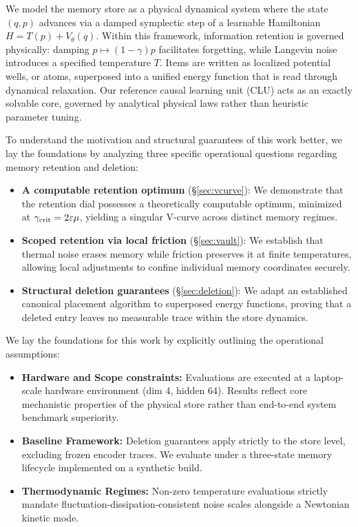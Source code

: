 \documentclass{article}
\begin{document}
We model the memory store as a physical dynamical system where the state $(q,p)$ advances via a damped symplectic step of a learnable Hamiltonian $H=T(p)+V_\theta(q)$. Within this framework, information retention is governed physically: damping $p\mapsto(1-\gamma)p$ facilitates forgetting, while Langevin noise introduces a specified temperature $T$. Items are written as localized potential wells, or atoms, superposed into a unified energy function that is read through dynamical relaxation. Our reference causal learning unit (CLU) acts as an exactly solvable core, governed by analytical physical laws rather than heuristic parameter tuning.

To understand the motivation and structural guarantees of this work better, we lay the foundations by analyzing three specific operational questions regarding memory retention and deletion:
\begin{itemize}
\item \textbf{A computable retention optimum} (\S\ref{sec:vcurve}): We demonstrate that the retention dial possesses a theoretically computable optimum, minimized at $\gamma_{\rm crit}=2\varepsilon\mu$, yielding a singular V-curve across distinct memory regimes.
\item \textbf{Scoped retention via local friction} (\S\ref{sec:vault}): We establish that thermal noise erases memory while friction preserves it at finite temperatures, allowing local adjustments to confine individual memory coordinates securely.
\item \textbf{Structural deletion guarantees} (\S\ref{sec:deletion}): We adapt an established canonical placement algorithm to superposed energy functions, proving that a deleted entry leaves no measurable trace within the store dynamics.
\end{itemize}

We lay the foundations for this work by explicitly outlining the operational assumptions:
\begin{itemize}
\item \textbf{Hardware and Scope constraints:} Evaluations are executed at a laptop-scale hardware environment (dim 4, hidden 64). Results reflect core mechanistic properties of the physical store rather than end-to-end system benchmark superiority.
\item \textbf{Baseline Framework:} Deletion guarantees apply strictly to the store level, excluding frozen encoder traces. We evaluate under a three-state memory lifecycle implemented on a synthetic build.
\item \textbf{Thermodynamic Regimes:} Non-zero temperature evaluations strictly mandate fluctuation-dissipation-consistent noise scales alongside a Newtonian kinetic mode.
\end{itemize}
\end{document}

